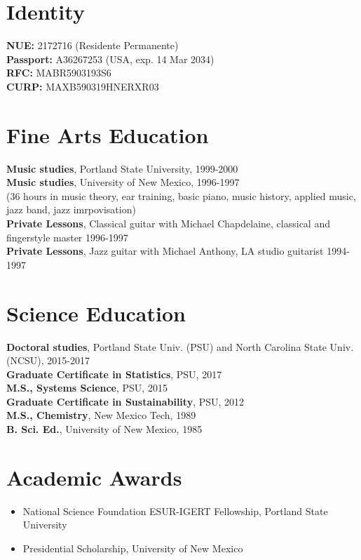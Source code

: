  
\begin{resume}

\section{Identity}
\textbf{NUE:} 2172716 (Residente Permanente) \\
\textbf{Passport:} A36267253 (USA, exp. 14 Mar 2034) \\
\textbf{RFC:} MABR5903193S6 \\
\textbf{CURP:} MAXB590319HNERXR03


\section{Fine Arts Education}
\textbf{Music studies}, Portland State University, 1999-2000 \\
\textbf{Music studies}, University of New Mexico, 1996-1997 \\
(36 hours in music theory, ear training, basic piano, music history, applied music, jazz band, jazz imrpovisation) \\
\textbf{Private Lessons}, Classical guitar with Michael Chapdelaine, classical and fingerstyle master 1996-1997 \\
\textbf{Private Lessons}, Jazz guitar with Michael Anthony, LA studio guitarist 1994-1997


\section{Science Education}
\textbf{Doctoral studies}, Portland State Univ. (PSU) and North Carolina State Univ. (NCSU), 2015-2017\\
\textbf {Graduate Certificate in Statistics}, PSU, 2017 \\
\textbf{M.S., Systems Science}, PSU, 2015 \\
\textbf {Graduate Certificate in Sustainability}, PSU, 2012 \\
\textbf{M.S., Chemistry}, New Mexico Tech, 1989 \\
\textbf{B. Sci. Ed.}, University of New Mexico, 1985


\section{Academic Awards}
\begin{itemize}
\itemsep -2pt %
\item National Science Foundation ESUR-IGERT Fellowship, Portland State University
\item Presidential Scholarship, University of New Mexico
\end{itemize}



\end{resume}
